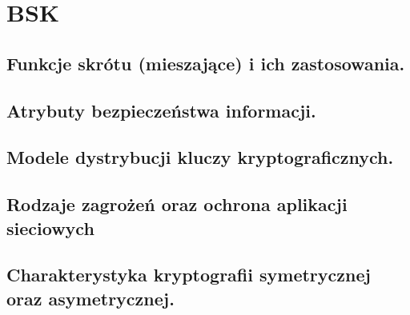 \chapter{BSK}
\section{Funkcje skrótu (mieszające) i ich zastosowania. }
\section{Atrybuty bezpieczeństwa informacji.}
\section{Modele dystrybucji kluczy kryptograficznych.}
\section{Rodzaje zagrożeń oraz ochrona aplikacji sieciowych}
\section{Charakterystyka kryptografii symetrycznej oraz asymetrycznej.}